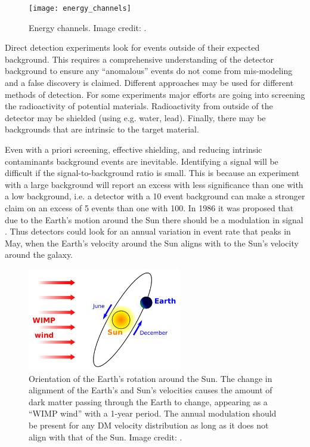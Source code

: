\begin{figure}
\centering
\texttt{[image: energy\_channels]}
\caption{Energy channels.  Image credit: .}
\label{fig:energy_channels}
\end{figure}
 
Direct detection experiments look for events outside of their expected background.  This requires a comprehensive
understanding of the detector background to ensure any ``anomalous'' events do not come from mis-modeling and a false discovery is
claimed.  Different approaches may be
used for different methods of detection.  For some experiments major efforts are going into screening the radioactivity of
potential materials.  Radioactivity from outside of the detector may be shielded (using e.g. water, lead).  Finally, there may be
backgrounds that are intrinsic to the target material.

 
Even with a priori screening, effective shielding, and reducing intrinsic contaminants background events are inevitable.  Identifying a
signal will be difficult if the signal-to-background ratio is small.  This is because
an experiment with a large background will report an excess with less significance than one with a low background, i.e. a detector with a
10 event
background can make a stronger claim on an excess of 5 events than one with 100.  In 1986 it was proposed
that due to the Earth's motion around the Sun there should be a modulation in signal .  Thus
detectors could look for an annual variation in event rate that peaks in May, when the Earth's velocity around the
Sun aligns with to the Sun's velocity around the galaxy.

\begin{figure}
\includegraphics[width=0.6\textwidth]{wimp_wind}
\caption{Orientation of the Earth's rotation around the Sun.  The change in alignment of the Earth's and Sun's velocities causes the
amount of dark matter passing through the Earth to change, appearing as a ``WIMP wind'' with a 1-year period.  The annual modulation
should be present for any DM velocity distribution as long as it does not align with that of the Sun.  Image credit:
.}
\label{fig:direct_detect_modulation}
\end{figure}
 
